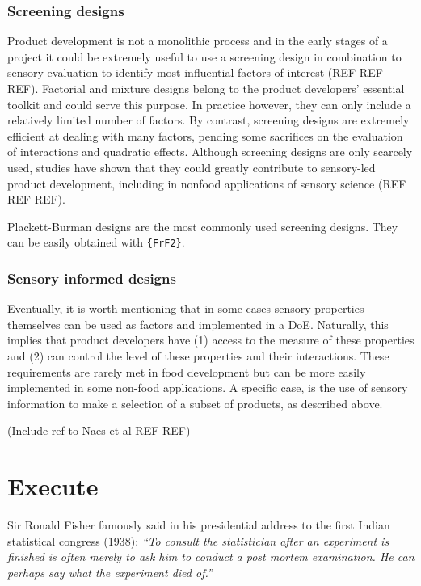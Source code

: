 \documentclass[
]{book}
\begin{document}
\hypertarget{screening-designs}{%
\subsubsection{Screening designs}\label{screening-designs}}

Product development is not a monolithic process and in the early stages of a project it could be extremely useful to use a screening design in combination to sensory evaluation to identify most influential factors of interest (REF REF REF). Factorial and mixture designs belong to the product developers' essential toolkit and could serve this purpose. In practice however, they can only include a relatively limited number of factors. By contrast, screening designs are extremely efficient at dealing with many factors, pending some sacrifices on the evaluation of interactions and quadratic effects.
Although screening designs are only scarcely used, studies have shown that they could greatly contribute to sensory-led product development, including in nonfood applications of sensory science (REF REF REF).

Plackett-Burman designs are the most commonly used screening designs. They can be easily obtained with \texttt{\{FrF2\}}.

\hypertarget{sensory-informed-designs}{%
\subsubsection{Sensory informed designs}\label{sensory-informed-designs}}

Eventually, it is worth mentioning that in some cases sensory properties themselves can be used as factors and implemented in a DoE. Naturally, this implies that product developers have (1) access to the measure of these properties and (2) can control the level of these properties and their interactions. These requirements are rarely met in food development but can be more easily implemented in some non-food applications.
A specific case, is the use of sensory information to make a selection of a subset of products, as described above.

(Include ref to Naes et al REF REF)

\hypertarget{execute-1}{%
\section{Execute}\label{execute-1}}

Sir Ronald Fisher famously said in his presidential address to the first Indian statistical congress (1938): \emph{``To consult the statistician after an experiment is finished is often merely to ask him to conduct a post mortem examination. He can perhaps say what the experiment died of.''}
\end{document}
